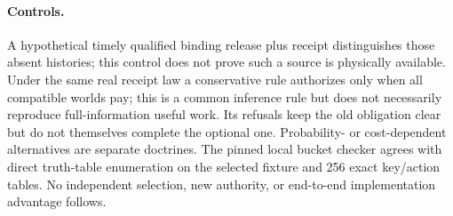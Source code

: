 \documentclass{article}
\begin{document}
\paragraph{Controls.}
A hypothetical timely qualified binding release plus receipt
distinguishes those absent histories; this control does not prove
such a source is physically available. Under the same real receipt
law a conservative rule authorizes only when all compatible
worlds pay; this is a common inference rule but does not necessarily
reproduce full-information useful work. Its refusals keep the
old obligation clear but do not themselves complete the optional one.
Probability- or cost-dependent alternatives are separate doctrines.
The pinned local bucket checker agrees with direct truth-table
enumeration on the selected fixture and 256 exact key/action tables.
No independent selection, new authority, or end-to-end implementation
advantage follows.
\end{document}
